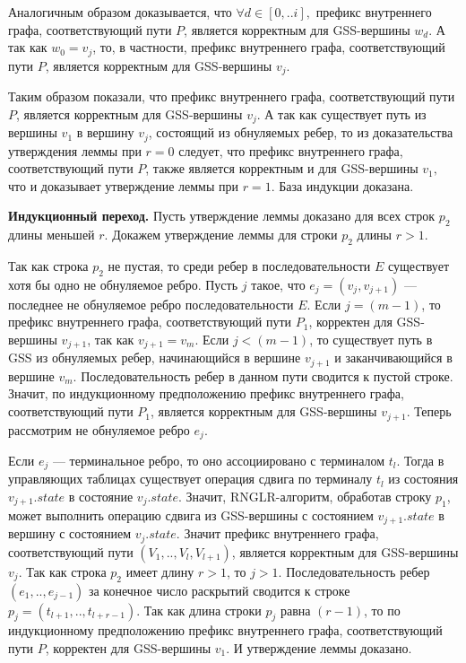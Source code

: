 Аналогичным образом доказывается, что $\forall d \in [0,..i],$ префикс внутреннего графа, соответствующий пути $P$, является корректным для GSS-вершины $w_{d}$. А так как $w_{0} = v_{j}$, то, в частности, префикс внутреннего графа, соответствующий пути $P$, является корректным для GSS-вершины $v_{j}$.

Таким образом показали, что префикс внутреннего графа, соответствующий пути $P$, является корректным для GSS-вершины $v_{j}$. А так как существует путь из вершины $v_{1}$ в вершину $v_{j}$, состоящий из обнуляемых ребер, то из доказательства утверждения леммы при $r = 0$ следует, что префикс внутреннего графа, соответствующий пути $P$, также является корректным и для GSS-вершины $v_{1},$ что и доказывает утверждение леммы при $r = 1$. База индукции доказана.

\textbf{Индукционный переход.} Пусть утверждение леммы доказано для всех строк $p_{2}$ длины меньшей $r$. Докажем утверждение леммы для строки $p_{2}$ длины $r > 1$.

Так как строка $p_{2}$ не пустая, то среди ребер в последовательности $E$ существует хотя бы одно не обнуляемое ребро. Пусть $j$ такое, что $e_{j} = (v_{j}, v_{j+1})$ --- последнее не обнуляемое ребро последовательности $E$. Если $j = (m - 1)$, то префикс внутреннего графа, соответствующий пути $P_{1}$, корректен для GSS-вершины $v_{j+1}$, так как $v_{j+1} = v_{m}$. Если $j < (m - 1)$, то существует путь в GSS из обнуляемых ребер, начинающийся в вершине $v_{j+1}$ и заканчивающийся в вершине $v_{m}$. Последовательность ребер в данном пути сводится к пустой строке. Значит, по индукционному предположению префикс внутреннего графа, соответствующий пути $P_{1}$, является корректным для GSS-вершины $v_{j+1}$. Теперь рассмотрим не обнуляемое ребро $e_{j}$.

Если $e_{j}$ --- терминальное ребро, то оно ассоциировано с терминалом $t_{l}$. Тогда в управляющих таблицах существует операция сдвига по терминалу $t_{l}$ из состояния $v_{j+1}.state$ в состояние $v_{j}.state$. Значит, RNGLR-алгоритм, обработав строку $p_{1}$, может выполнить операцию сдвига из GSS-вершины с состоянием $v_{j+1}.state$ в вершину с состоянием $v_{j}.state$. Значит префикс внутреннего графа, соответствующий пути $(V_{1},..,V_{l},V_{l+1})$, является корректным для GSS-вершины $v_{j}$. Так как строка $p_{2}$ имеет длину $r > 1$, то $j > 1$. Последовательность ребер $(e_{1},..,e_{j-1})$ за конечное число раскрытий сводится к строке $p_{j} = (t_{l+1},..,t_{l+r-1})$. Так как длина строки $p_{j}$ равна $(r - 1)$, то по индукционному предположению префикс внутреннего графа, соответствующий пути $P$, корректен для GSS-вершины $v_{1}$. И утверждение леммы доказано.


